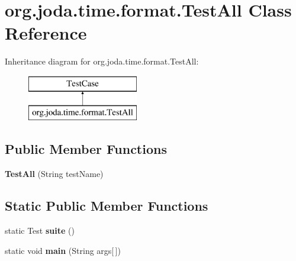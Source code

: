 \hypertarget{classorg_1_1joda_1_1time_1_1format_1_1_test_all}{\section{org.\-joda.\-time.\-format.\-Test\-All Class Reference}
\label{classorg_1_1joda_1_1time_1_1format_1_1_test_all}
}
Inheritance diagram for org.\-joda.\-time.\-format.\-Test\-All\-:\begin{figure}[H]
\begin{center}
\leavevmode
\includegraphics[height=2.000000cm]{classorg_1_1joda_1_1time_1_1format_1_1_test_all}
\end{center}
\end{figure}
\subsection*{Public Member Functions}
\begin{DoxyCompactItemize}
\item 
\hypertarget{classorg_1_1joda_1_1time_1_1format_1_1_test_all_a1fe69501bc8f76c77e1987224547d93e}{{\bfseries Test\-All} (String test\-Name)}\label{classorg_1_1joda_1_1time_1_1format_1_1_test_all_a1fe69501bc8f76c77e1987224547d93e}

\end{DoxyCompactItemize}
\subsection*{Static Public Member Functions}
\begin{DoxyCompactItemize}
\item 
\hypertarget{classorg_1_1joda_1_1time_1_1format_1_1_test_all_a5ec1b224ab6ea913dd42a817c9dc50a2}{static Test {\bfseries suite} ()}\label{classorg_1_1joda_1_1time_1_1format_1_1_test_all_a5ec1b224ab6ea913dd42a817c9dc50a2}

\item 
\hypertarget{classorg_1_1joda_1_1time_1_1format_1_1_test_all_a1ed3ad4432e99e4f8428d4bed9a5a71e}{static void {\bfseries main} (String args\mbox{[}$\,$\mbox{]})}\label{classorg_1_1joda_1_1time_1_1format_1_1_test_all_a1ed3ad4432e99e4f8428d4bed9a5a71e}

\end{DoxyCompactItemize}


